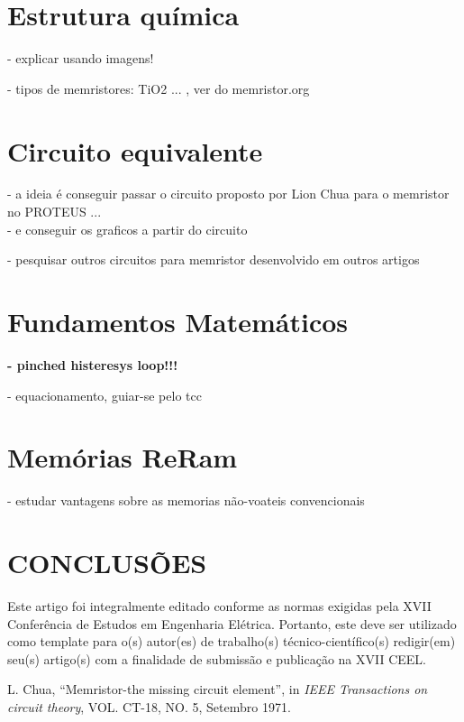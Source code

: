 \documentclass{ceel}
\begin{document}
\begin{multicols}{2}
\section{Estrutura química}
- explicar usando imagens!

- tipos de memristores: TiO2 ... , ver do memristor.org

\section{Circuito equivalente}
- a ideia é conseguir passar o circuito proposto por Lion Chua para o memristor no PROTEUS ... \\
- e conseguir os graficos a partir do circuito

- pesquisar outros circuitos para memristor desenvolvido em outros artigos

\section{Fundamentos Matemáticos}
\textbf{- pinched histeresys loop!!!}\par
- equacionamento, guiar-se pelo tcc 

\section{Memórias ReRam}
- estudar vantagens sobre as memorias não-voateis convencionais\\

\section{CONCLUSÕES}
Este artigo foi integralmente editado conforme as normas exigidas pela XVII Conferência de Estudos em Engenharia Elétrica. Portanto, este deve ser utilizado como template para o(s) autor(es) de trabalho(s) técnico-científico(s) redigir(em) seu(s) artigo(s) com a finalidade de submissão e publicação na XVII CEEL.

\begin{thebibliography}{9} %

    L. Chua,
    “Memristor-the missing circuit element”, 
    in \emph{IEEE Transactions on circuit theory}, VOL. CT-18, NO. 5, Setembro 1971.
   
\end{thebibliography}


\end{multicols}
\end{document}
